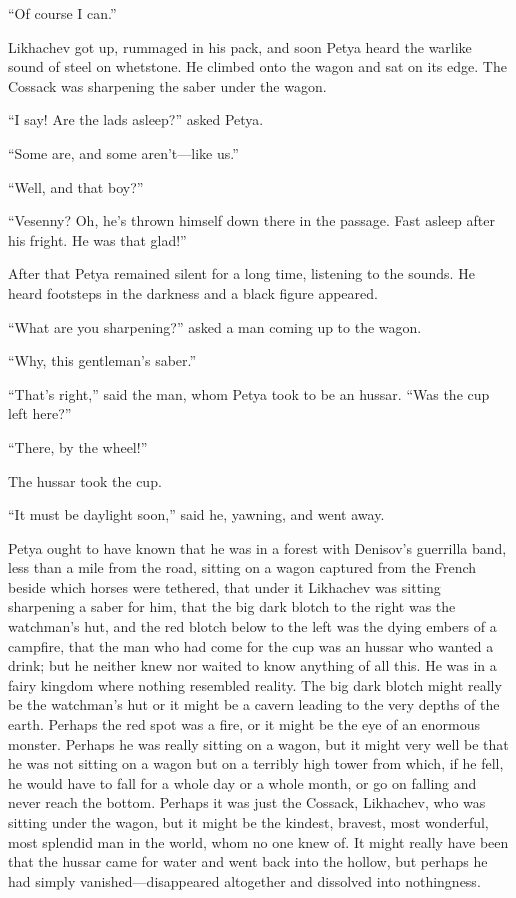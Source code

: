 ``Of course I can.''

Likhachev got up, rummaged in his pack, and soon Petya heard the
warlike sound of steel on whetstone. He climbed onto the wagon
and sat on its edge. The Cossack was sharpening the saber under
the wagon.

``I say! Are the lads asleep?'' asked Petya.

``Some are, and some aren't---like us.''

``Well, and that boy?''

``Vesenny? Oh, he's thrown himself down there in the
passage. Fast asleep after his fright. He was that glad!''

After that Petya remained silent for a long time, listening to
the sounds. He heard footsteps in the darkness and a black figure
appeared.

``What are you sharpening?'' asked a man coming up to the wagon.

``Why, this gentleman's saber.''

``That's right,'' said the man, whom Petya took to be an
hussar. ``Was the cup left here?''

``There, by the wheel!''

The hussar took the cup.

``It must be daylight soon,'' said he, yawning, and went away.

Petya ought to have known that he was in a forest with Denisov's
guerrilla band, less than a mile from the road, sitting on a
wagon captured from the French beside which horses were tethered,
that under it Likhachev was sitting sharpening a saber for him,
that the big dark blotch to the right was the watchman's hut, and
the red blotch below to the left was the dying embers of a
campfire, that the man who had come for the cup was an hussar who
wanted a drink; but he neither knew nor waited to know anything
of all this. He was in a fairy kingdom where nothing resembled
reality. The big dark blotch might really be the watchman's hut
or it might be a cavern leading to the very depths of the
earth. Perhaps the red spot was a fire, or it might be the eye of
an enormous monster. Perhaps he was really sitting on a wagon,
but it might very well be that he was not sitting on a wagon but
on a terribly high tower from which, if he fell, he would have to
fall for a whole day or a whole month, or go on falling and never
reach the bottom. Perhaps it was just the Cossack, Likhachev, who
was sitting under the wagon, but it might be the kindest,
bravest, most wonderful, most splendid man in the world, whom no
one knew of. It might really have been that the hussar came for
water and went back into the hollow, but perhaps he had simply
vanished---disappeared altogether and dissolved into nothingness.

